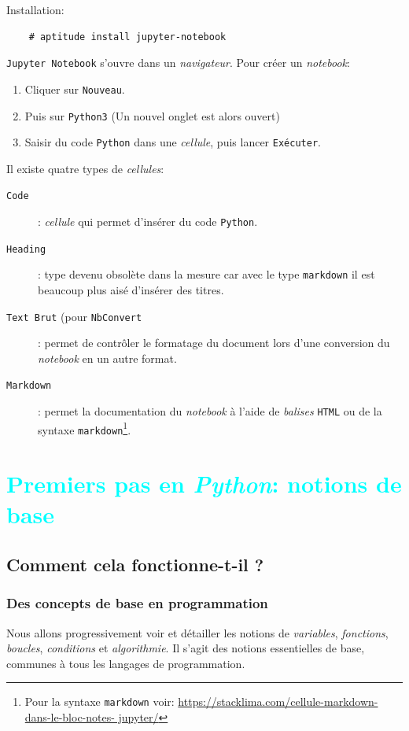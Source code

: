 \documentclass[a4paper,12pt]{book}
\begin{document}
Installation:
\begin{verbatim}
    # aptitude install jupyter-notebook
\end{verbatim}
\medskip

\texttt{Jupyter Notebook} s'ouvre dans un \textit{navigateur}. Pour créer un \textit{notebook}:
\begin{enumerate}
	\item Cliquer sur \texttt{Nouveau}.
	\item Puis sur \texttt{Python3} (Un nouvel onglet est alors ouvert)
	\item Saisir du code \texttt{Python} dans une \textit{cellule}, puis lancer \texttt{Exécuter}.
\end{enumerate}
\medskip

Il existe quatre types de \textit{cellules}: 
\begin{description}
	\item[\texttt{Code}]: \textit{cellule} qui permet d'insérer du code \texttt{Python}.
	\item[\texttt{Heading}]: type devenu obsolète dans la mesure car avec le type \texttt{markdown} il est beaucoup plus aisé d'insérer des titres.
	\item[\texttt{Text Brut} (pour \texttt{NbConvert}]: permet de contrôler le formatage du document lors d'une conversion du \textit{notebook} en un autre format.
	\item[\texttt{Markdown}]: permet la documentation du \textit{notebook} à l'aide de \textit{balises} \texttt{HTML} ou de la syntaxe \texttt{markdown}\footnote{Pour la syntaxe \texttt{markdown} voir: \url{https://stacklima.com/cellule-markdown-dans-le-bloc-notes- jupyter/}}.
\end{description}
\medskip

\part{\textcolor{cyan}{Premiers pas en \textit{Python}: notions de base}}

\chapter{Comment cela fonctionne-t-il ?}
\section{Des concepts de base en programmation}
Nous allons progressivement voir et détailler les notions de \textit{variables}, \textit{fonctions}, \textit{boucles}, \textit{conditions} et \textit{algorithmie}. Il s'agit des notions essentielles de base, communes à tous les langages de programmation.
\medskip
\end{document}
